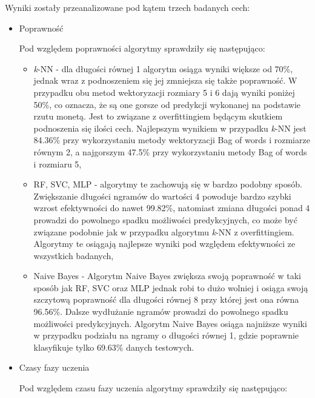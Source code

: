 Wyniki zostały przeanalizowane pod kątem trzech badanych cech:

\begin{itemize}
    \item Poprawność
    
    Pod względem poprawności algorytmy sprawdziły się następująco:
    \begin{itemize}
        \item \textit{k}-NN -
        dla długości równej 1 algorytm osiąga wyniki większe od 70\%, jednak wraz 
        z podnoszeniem się jej zmniejsza się także poprawność. W przypadku obu metod 
        wektoryzacji rozmiary 5 i 6 dają wyniki poniżej 50\%, co oznacza, że są one gorsze 
        od predykcji wykonanej na podstawie rzutu monetą. Jest to związane 
        z overfittingiem będącym skutkiem podnoszenia się ilości cech. Najlepszym wynikiem w 
        przypadku \textit{k}-NN jest 84.36\% przy wykorzystaniu metody wektoryzacji Bag of words i rozmiarze równym 2,
        a najgorszym 47.5\%  przy wykorzystaniu metody Bag of words i rozmiaru 5,

        \item RF, SVC, MLP -        
        algorytmy te zachowują się w bardzo podobny sposób. Zwiększanie długości ngramów 
        do wartości 4 powoduje bardzo szybki wzrost efektywności do nawet 99.82\%, natomiast zmiana 
        długości ponad 4 prowadzi do powolnego spadku możliwości predykcyjnych, co może być 
        związane podobnie jak w przypadku algorytmu \textit{k}-NN z overfittingiem. Algorytmy te osiągają najlepsze 
        wyniki pod względem efektywności ze wszystkich badanych,
        \item Naive Bayes -
        Algorytm Naive Bayes zwiększa swoją poprawność w taki sposób jak RF, SVC oraz MLP 
        jednak robi to dużo wolniej i osiąga swoją szczytową poprawność dla długości równej 8 przy której 
        jest ona równa 96.56\%. Dalsze wydłużanie ngramów prowadzi do powolnego spadku możliwości predykcyjnych.
        Algorytm Naive Bayes osiąga najniższe wyniki w przypadku podziału na ngramy o długości równej 1, gdzie 
        poprawnie klasyfikuje tylko 69.63\% danych testowych.
    \end{itemize}
    \item Czasy fazy uczenia
    
    Pod względem czasu fazy uczenia algorytmy sprawdziły się następująco:
    

\end{itemize}

